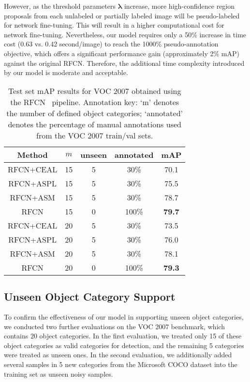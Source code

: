\documentclass[journal]{IEEEtran}
\begin{document}
{However, as the threshold parameters ${\bm \lambda}$ increase, more high-confidence region proposals from each unlabeled or partially labeled image will be pseudo-labeled for network fine-tuning. This will result in a higher computational cost for network fine-tuning. Nevertheless, our model requires only a 50\% increase in time cost (0.63 vs. 0.42 second/image) to reach the 1000\% pseudo-annotation objective, which offers a significant performance gain (approximately 2\% mAP) against the original RFCN. Therefore, the additional time complexity introduced by our model is moderate and acceptable.

\begin{table}[!t]
\footnotesize
\center
\setlength{\tabcolsep}{1.5pt}
\caption{{Test set mAP results for VOC 2007 obtained using the RFCN~\cite{rfcn16NIPS} pipeline. Annotation key: `m' denotes the number of defined object categories; `annotated' denotes the percentage of manual annotations used from the VOC 2007 train/val sets.}}\label{tab:07mAP12_unseen}
\vspace{-5pt}
{\begin{tabular}{c | c c | c | c }
\hline
\hline
Method & $m$ & unseen & annotated & mAP \\
\hline
RFCN+CEAL & 15 & 5 & 30\% & 70.1 \\
RFCN+ASPL & 15 & 5 & 30\% & 75.5 \\
RFCN+{ASM} & 15 & 5 & 30\% & 78.7  \\
RFCN & 15 & 0 & 100\% &\bf  79.7 \\
\hline
RFCN+CEAL & 20 & 5 & 30\% & 73.5 \\
RFCN+ASPL & 20 & 5 & 30\% & 76.0 \\
RFCN+{ASM} & 20 & 5 & 30\% & 78.1  \\
RFCN & 20 & 0 & 100\% &\bf  79.3 \\
\hline
\hline
\end{tabular}}
\vspace{-10pt}
\end{table}

\subsection{Unseen Object Category Support}
To confirm the effectiveness of our model in supporting unseen object categories, we conducted two further evaluations on the VOC 2007 benchmark, which contains 20 object categories. In the first evaluation, we treated only 15 of these object categories as valid categories for detection, and the remaining 5 categories were treated as unseen ones. In the second evaluation, we additionally added several samples in 5 new categories from the Microsoft COCO dataset into the training set as unseen noisy samples. 

}
\end{document}
